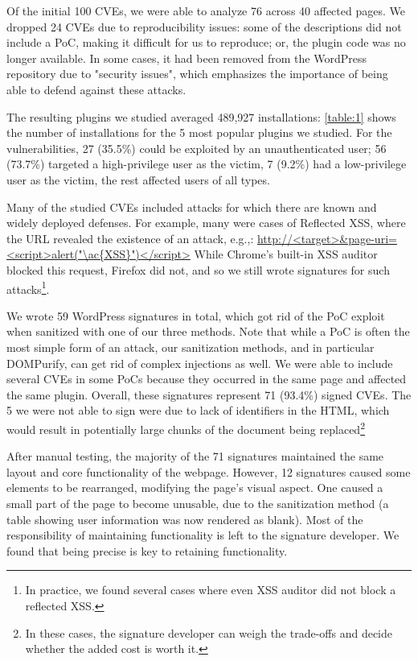 Of the initial 100 CVEs, we were able to analyze 76 across 40 affected
pages. We dropped 24 CVEs due to reproducibility issues: some of the
descriptions did not include a PoC, making it difficult for us to
reproduce; or, the plugin code was no longer available. In some cases,
it had been removed from the WordPress repository due to "security
issues", which emphasizes the importance of being able to defend
against these attacks. %

The resulting plugins we studied averaged 489,927
installations: \autoref{table:1} shows the number of installations for
the 5 most popular plugins we studied. For the vulnerabilities, 27
(35.5\%) could be exploited by an unauthenticated user; 56 (73.7\%)
targeted a high-privilege user as the victim, 7 (9.2\%) had a
low-privilege user as the victim, the rest affected users of all
types.

Many of the studied CVEs included attacks for which there are known
and widely deployed defenses. For example, many were cases of
Reflected \ac{XSS}, where the URL revealed the existence of an attack,
e.g.,: \url{http://<target>&page-uri=<script>alert("\ac{XSS}")</script>}
While Chrome's built-in \ac{XSS} auditor blocked this request, Firefox
did not, and so we still wrote signatures for such attacks\footnote{In
practice, we found several cases where even XSS auditor did not block
a reflected XSS.}.

We wrote 59 WordPress signatures in total, which got rid of the PoC
exploit when sanitized with one of our three methods. Note that while
a PoC is often the most simple form of an attack, our sanitization
methods, and in particular DOMPurify, can get rid of complex
injections as well. We were able to include several CVEs in some PoCs
because they occurred in the same page and affected the same
plugin. Overall, these signatures represent 71 (93.4\%) signed
CVEs. The 5 we were not able to sign were due to lack of identifiers
in the HTML, which would result in potentially large chunks of the
document being replaced\footnote{In these cases, the signature developer
can weigh the trade-offs and decide whether the added cost is worth
it.}

After manual testing, the majority of the 71 signatures maintained the
same layout and core functionality of the webpage. However, 12
signatures caused some elements to be rearranged, modifying the page's
visual aspect. One caused a small part of the page to become unusable,
due to the sanitization method (a table showing user information
was now rendered as blank). Most of the responsibility of maintaining
functionality is left to the signature developer. We found that being precise
is key to retaining functionality.


